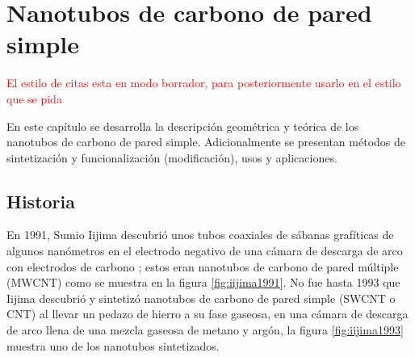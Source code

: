% 
% 

\chapter{Nanotubos de carbono de pared simple}
\textcolor{red}{El estilo de citas esta en modo borrador, para posteriormente usarlo en el estilo que se pida}

En este capítulo se desarrolla la descripción geométrica y teórica de los nanotubos de carbono de pared simple. Adicionalmente se presentan métodos de sintetización y funcionalización (modificación), usos y aplicaciones.\\


\section{Historia}

En 1991, Sumio Iijima descubrió unos tubos coaxiales de sábanas grafíticas de algunos nanómetros en el electrodo negativo de una cámara de descarga de arco con electrodos de carbono  \cite{Iijima1991}; estos eran nanotubos de carbono de pared múltiple (MWCNT) como se muestra en la figura \ref{fig:iijima1991}. No fue hasta 1993 que Iijima descubrió y sintetizó nanotubos de carbono de pared simple (SWCNT o CNT) \cite{Iijima1993} al llevar un pedazo de hierro a su fase gaseosa, en una cámara de descarga de arco llena de una mezcla gaseosa de metano y argón, la figura \ref{fig:iijima1993} muestra uno de los nanotubos sintetizados.\\

